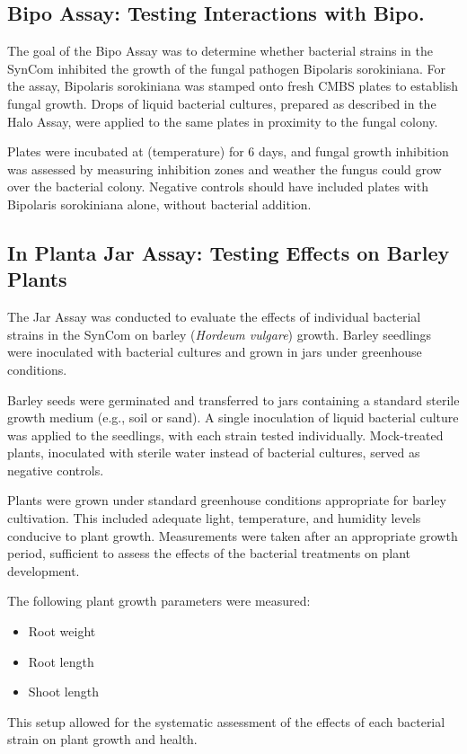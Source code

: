 \pagebreak

\subsection{Bipo Assay: Testing Interactions with Bipo.}
The goal of the Bipo Assay was to determine whether bacterial strains in the \ac{SynCom} inhibited the growth of the fungal pathogen Bipolaris sorokiniana. For the assay, Bipolaris sorokiniana was stamped onto fresh CMBS plates to establish fungal growth. Drops of liquid bacterial cultures, prepared as described in the Halo Assay, were applied to the same plates in proximity to the fungal colony.

Plates were incubated at (temperature) for 6 days, and fungal growth inhibition was assessed by measuring inhibition zones and weather the fungus could grow over the bacterial colony. Negative controls should have included plates with Bipolaris sorokiniana alone, without bacterial addition.

\subsection{In Planta Jar Assay: Testing Effects on Barley Plants}
The Jar Assay was conducted to evaluate the effects of individual bacterial strains in the \ac{SynCom} on barley (\textit{Hordeum vulgare}) growth. Barley seedlings were inoculated with bacterial cultures and grown in jars under greenhouse conditions.

Barley seeds were germinated and transferred to jars containing a standard sterile growth medium (e.g., soil or sand). A single inoculation of liquid bacterial culture was applied to the seedlings, with each strain tested individually. Mock-treated plants, inoculated with sterile water instead of bacterial cultures, served as negative controls.

Plants were grown under standard greenhouse conditions appropriate for barley cultivation. This included adequate light, temperature, and humidity levels conducive to plant growth. Measurements were taken after an appropriate growth period, sufficient to assess the effects of the bacterial treatments on plant development.

The following plant growth parameters were measured:
\begin{itemize}
    \item Root weight
    \item Root length
    \item Shoot length
\end{itemize}

This setup allowed for the systematic assessment of the effects of each bacterial strain on plant growth and health.
